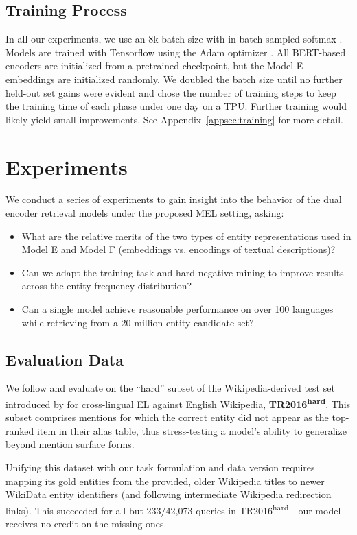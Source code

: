 \documentclass[11pt,a4paper]{article}
\newcommand*{\TR}{TR2016\textsuperscript{hard}}
\begin{document}
\subsection{Training Process}
In all our experiments, we use an 8k batch size with in-batch sampled softmax \citep{gillick2018end}.
Models are trained with Tensorflow \citep{abadi2016tensorflow} using the Adam optimizer \cite{kingma2015adam,Loshchilov2019DecoupledWD}.
All BERT-based encoders are initialized from a pretrained checkpoint, but the Model E embeddings are initialized randomly.
We doubled the batch size until no further held-out set gains were evident and chose the number of training steps to keep the training time of each phase under one day on a TPU. Further training would likely yield small improvements.
See Appendix~\ref{appsec:training} for more detail.

\section{Experiments}
We conduct a series of experiments to gain insight into the behavior of the dual encoder retrieval models under the proposed MEL setting, asking:
\begin{itemize}
\itemsep-0.2em
\item What are the relative merits of the two types of entity representations used in Model E and Model F (embeddings vs. encodings of textual descriptions)?\item Can we adapt the training task and hard-negative mining to improve results across the entity frequency distribution?
\item Can a single model achieve reasonable performance on over 100 languages while retrieving from a 20 million entity candidate set?\end{itemize}

\subsection{Evaluation Data}
We follow  and evaluate on the ``hard'' subset of the Wikipedia-derived test set introduced by
 for cross-lingual EL against English Wikipedia, \textbf{\TR}.
This subset comprises mentions for which the correct entity did not appear as the top-ranked item in their alias table, thus stress-testing a model's ability to generalize beyond mention surface forms. 

Unifying this dataset with our task formulation and data version requires mapping its gold entities from the provided, older Wikipedia titles to newer WikiData entity identifiers (and following intermediate Wikipedia redirection links).
This succeeded for all but 233/42,073 queries in \TR{}---our model receives no credit on the missing ones.
\end{document}
